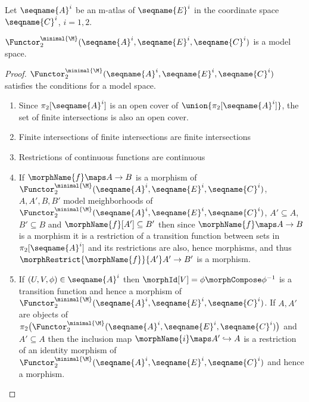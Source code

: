 \documentclass{article}
\begin{document}
\begin{lemma}
\label{lem:M-ismodC}
Let $\seqname{A}^i$ be an m-atlas of $\seqname{E}^i$ in the coordinate space
$\seqname{C}^i$, $i=1,2$.

$
  \Functor^{\minimal{\M}}_2
    (\seqname{A}^i, \seqname{E}^i, \seqname{C}^i)
$
is a model space.

\begin{proof}
$
  \Functor^{\minimal{\M}}_2
    (\seqname{A}^i, \seqname{E}^i, \seqname{C}^i)
$
satisfies the conditions for a model space.

\begin{enumerate}
\item Since $\pi_2[\seqname{A}^i]$ is an open cover of
$\union{\pi_2[\seqname{A}^i]}$, the set of finite intersections is also
an open cover.

\item Finite intersections of finite intersections are finite intersections

\item Restrictions of continuous functions are continuous

\item If $\morphName{f} \maps A \to B$ is a morphism of
$
  \Functor^{\minimal{\M}}_2
    (\seqname{A}^i, \seqname{E}^i, \seqname{C}^i)
$,
$A, A', B, B'$ model meighborhoods of
$
  \Functor^{\minimal{\M}}_2
    (\seqname{A}^i, \seqname{E}^i, \seqname{C}^i)
$,
$A' \subseteq A$, $B' \subseteq B$ and $\morphName{f}[A'] \subseteq B'$
then since $\morphName{f} \maps A \to B$ is a morphism it is a
restriction of a transition function between sets in
$\pi_2[\seqname{A}^i]$ and its restrictions are also, hence morphisms,
and thus $\morphRestrict{\morphName{f}}{A'} A' \to B'$ is a morphism.

\item
If $(U,V,\phi) \in \seqname{A}^i$ then
$\morphId[{V}] = \phi \morphCompose \phi^{-1}$ is a transition function and hence a
morphism of
$
  \Functor^{\minimal{\M}}_2
    (\seqname{A}^i, \seqname{E}^i, \seqname{C}^i)
$.
If $A, A'$ are objects of
$
  \pi_2
    \bigl (
      \Functor^{\minimal{\M}}_2
        (\seqname{A}^i, \seqname{E}^i, \seqname{C}^i)
    \bigr )
$
and $A' \subseteq A$ then the inclusion map
$\morphName{i} \maps A' \hookrightarrow A$ is a restriction of an
identity morphism of
$
  \Functor^{\minimal{\M}}_2
    (\seqname{A}^i, \seqname{E}^i, \seqname{C}^i)
$
and hence a morphism.


\end{enumerate}
\end{proof}
\end{lemma}
\end{document}
